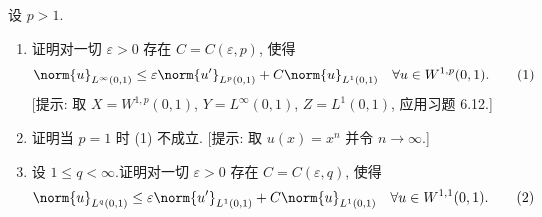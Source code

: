 \begin{exercise}
\label{exer:8.5}
设 $p>1$.
\begin{enumerate}[label=\arabic*., leftmargin=2.2em, itemsep=0.3em]
	\item 证明对一切 $\varepsilon>0$ 存在 $C=C(\varepsilon,p)$, 使得
	      \begin{equation}
	      \norm{u}_{L^\infty(0,1)}\le\varepsilon\norm{u'}_{L^p(0,1)}
	      +C\norm{u}_{L^1(0,1)}\quad\forall u\in W^{1,p}(0,1).
	      \tag{1}
	      \end{equation}
	      [提示: 取 $X=W^{1,p}(0,1)$, $Y=L^\infty(0,1)$,
	      $Z=L^1(0,1)$, 应用习题 6.12.]
	\item 证明当 $p=1$ 时 (1) 不成立.
	      [提示: 取 $u(x)=x^n$ 并令 $n\to\infty$.]
	\item 设 $1\le q<\infty$.证明对一切 $\varepsilon>0$ 存在
	      $C=C(\varepsilon,q)$, 使得
	      \begin{equation}
	      \norm{u}_{L^q(0,1)}\le\varepsilon\norm{u'}_{L^1(0,1)}
	      +C\norm{u}_{L^1(0,1)}\quad\forall u\in W^{1,1}(0,1).
	      \tag{2}
	      \end{equation}
\end{enumerate}
\end{exercise}

